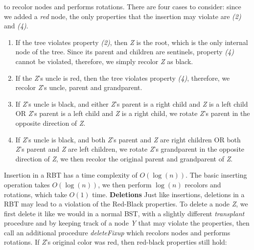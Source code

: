 \documentclass[14pt]{article}
\begin{document}
to recolor nodes and performs rotations. \newline
There are four cases to consider: since we added a \textit{red} node, the only properties that the insertion may violate
are \textit{(2)} and \textit{(4)}.
\begin{enumerate}
    \item If the tree violates property \textit{(2)}, then \textit{Z} is the root, which is the only internal
    node of the tree.
    Since its parent and children are sentinels, property \textit{(4)} cannot be violated, therefore, we simply recolor
    \textit{Z} as black.
    \item If the \textit{Z}'s uncle is red, then the tree violates property \textit{(4)}, therefore, we recolor
    \textit{Z}'s uncle, parent and grandparent.
    \item If \textit{Z}'s uncle is black, and either \textit{Z}'s parent is a right child and \textit{Z} is a left child
    OR \textit{Z}'s parent is a left child and \textit{Z} is a right child, we rotate \textit{Z}'s parent in
    the opposite direction of \textit{Z}.
    \item If \textit{Z}'s uncle is black, and both \textit{Z}'s parent and \textit{Z} are right children OR
    both \textit{Z}'s parent and \textit{Z} are left children, we rotate \textit{Z}'s grandparent in the opposite
    direction of \textit{Z}, we then recolor the original parent and grandparent of \textit{Z}.
\end{enumerate}
    Insertion in a RBT has a time complexity of $O(\log(n))$. \newline
    The basic inserting operation takes $O(\log(n))$, we then perform $\log(n)$ recolors and rotations,
    which take $O(1)$ time. \newline \newline \newline
\textbf{Deletions} \newline \newline
Just like insertions, deletions in a RBT may lead to a violation of the Red-Black properties. \newline
To delete a node \textit{Z}, we first delete it like we would in a normal BST, with a slightly different
    \textit{transplant} procedure and by keeping track of a node \textit{Y} that may violate the properties, then
    call an additional procedure \textit{deleteFixup} which recolors nodes and performs rotations. \newline
If \textit{Z}'s original color was red, then red-black properties still hold:
\end{document}
